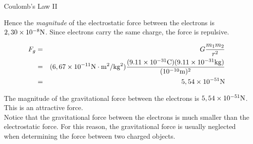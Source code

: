\begin{wex}{Coulomb's Law II}
{Hence the {\em magnitude} of the electrostatic force between the
electrons is $2,30\times10^{-8}\rm N$. Since electrons carry the
same charge, the force is repulsive.


\begin{eqnarray*}
F_g&=&G\frac{m_1m_2}{r^2}\\
&=&(6,67\times10^{-11}{\rm N\cdot m^2/kg^2})\frac{(9.11\times10^{-31}{\rm C}) (9.11\times10^{-31}{\rm kg})}{(10^{-10}{\rm m})^2}\\
&=&5,54\times10^{-51}{\rm N}
\end{eqnarray*}

The magnitude of the gravitational force between the electrons is
$5,54\times10^{-51}\rm N$. This is an attractive force.\\

Notice that the gravitational force between the electrons is much
smaller than the electrostatic force. For this reason, the
gravitational force is usually neglected when determining the
force between two charged objects.}
\end{wex}



